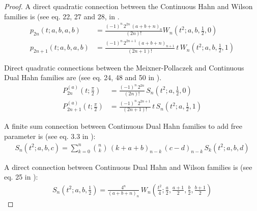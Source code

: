 \documentclass[a4paper,11pt,twoside]{amsart}
\newcommand{\defeq}{=}
\newcommand{\defeq}{\stackrel{\scriptscriptstyle \textnormal{def}}{=}}
\begin{document}
\begin{proof}
A direct quadratic connection between the Continuous Hahn and Wilson families is (see eq. 22, 27 and 28, in \cite{koesup}.
\begin{align}
 p_{2n}(t;a,b,a,b) &\defeq \frac{(-1)^n\,2^{2n}\,(a+b+n)_n}{(2n)!} W_n\left(t^2;a,b,\frac12,0\right) \label{con3} \\
 p_{2n+1}(t;a,b,a,b) &\defeq \frac{(-1)^n\,2^{2n+1}\,(a+b+n)_{n+1}}{(2n+1)!}\,t\, W_n\left(t^2;a,b,\frac12,1\right) \label{con31}
\end{align}

Direct quadratic connections between the Meixner-Pollaczek and Continuous Dual Hahn families are (see eq. 24, 48 and 50 in \cite{koesup}).
\begin{align}
 P_{2n}^{(a)}\left(t;\frac{\pi}{2}\right) &\defeq \frac{(-1)^n\,2^{2n}}{(2n)!}\,S_n\left(t^2;a,\frac12,0\right) \label{con4} \\
 P_{2n+1}^{(a)}\left(t;\frac{\pi}{2}\right) &\defeq \frac{(-1)^n\,2^{2n+1}}{(2n+1)!}\,t\,S_n\left(t^2;a,\frac12,1\right) \label{con41}
\end{align}

A  finite sum connection between Continuous Dual Hahn families to add free parameter is (see eq. 3.3 in \cite{connex}):
\begin{align}
 S_n\left(t^2;a,b,c\right) \defeq \sum_{k=0}^n \binom{n}{k}\,(k+a+b)_{n-k}\,(c-d)_{n-k}\,S_k(t^2;a,b,d) \label{con5}
\end{align}

A direct connection between Continuous Dual Hahn and Wilson families is (see eq. 25 in \cite{koesup}):
\begin{align}
 S_n\left(t^2;a,b,\frac12\right) \defeq \frac{4^n}{(a+b+n)_n}\, W_n\left(\frac{t^2}{4};\frac{a}{2},\frac{a+1}{2},\frac{b}{2},\frac{b+1}{2}\right) \label{con6}
\end{align}



\end{proof}
\end{document}
